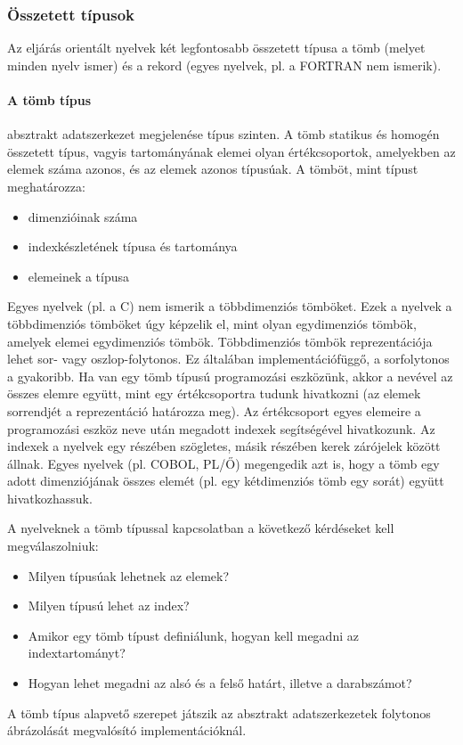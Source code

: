 \subsubsection{Összetett típusok}
Az eljárás orientált nyelvek két legfontosabb összetett típusa a tömb (melyet minden nyelv ismer) és a rekord (egyes nyelvek, pl. a FORTRAN nem ismerik).
\paragraph{A tömb típus} absztrakt adatszerkezet megjelenése típus szinten. A tömb statikus és homogén összetett típus, vagyis tartományának elemei olyan értékcsoportok, amelyekben az elemek száma azonos, és az elemek azonos típusúak. A tömböt, mint típust meghatározza:
\begin{itemize}[noitemsep]
	\item dimenzióinak száma
	\item indexkészletének típusa és tartománya
	\item elemeinek a típusa
\end{itemize}
Egyes nyelvek (pl. a C) nem ismerik a többdimenziós tömböket. Ezek a nyelvek a többdimenziós tömböket úgy képzelik el, mint olyan egydimenziós tömbök, amelyek elemei egydimenziós tömbök. Többdimenziós tömbök reprezentációja lehet sor- vagy oszlop-folytonos. Ez általában implementációfüggő, a sorfolytonos a gyakoribb. Ha van egy tömb típusú programozási eszközünk, akkor a nevével az összes elemre együtt, mint egy értékcsoportra tudunk hivatkozni (az elemek sorrendjét a reprezentáció határozza meg). Az értékcsoport egyes elemeire a programozási eszköz neve után megadott indexek segítségével hivatkozunk. Az indexek a nyelvek egy részében szögletes, másik részében kerek zárójelek között állnak. Egyes nyelvek (pl. COBOL, PL/Ő) megengedik azt is, hogy a tömb egy adott dimenziójának összes elemét (pl. egy kétdimenziós tömb egy sorát) együtt hivatkozhassuk.

A nyelveknek a tömb típussal kapcsolatban a következő kérdéseket kell megválaszolniuk:
\begin{itemize}[noitemsep]
	\item Milyen típusúak lehetnek az elemek?
	\item Milyen típusú lehet az index?
	\item Amikor egy tömb típust definiálunk, hogyan kell megadni az indextartományt?
	\item Hogyan lehet megadni az alsó és a felső határt, illetve a darabszámot?
\end{itemize}
A tömb típus alapvető szerepet játszik az absztrakt adatszerkezetek folytonos ábrázolását megvalósító
implementációknál.
